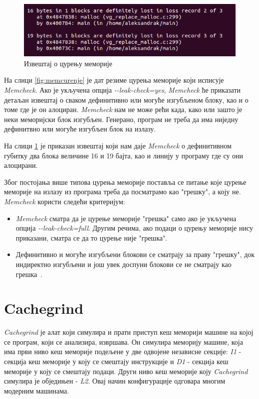 \documentclass[12pt,oneside]{memoir}
\begin{document}
\begin{figure}[h!]
\begin{center}
\includegraphics[scale=0.75]{slika9.png}
\end{center}
\caption{Извештај о цурењу меморије}
\label{fig:memizv}
\end{figure}


\indent На слици \ref{fig:memcurenje} је дат резиме цурења меморије који исписује \textit{Memcheck}. Ако је укључена опција \textit{-\--leak-check=yes}, \textit{Memcheck} ће приказати детаљан извештај о сваком дефинитивно или могуће изгубљеном блоку,  као и о томе где је он алоциран. \textit{Memcheck} нам не може рећи када, како или зашто је неки меморијски блок изгубљен. Генерано, програм не треба да има ниједну дефинитвно или могуће изгубљен блок на излазу.

\indent На слици \ref{fig:memizv} је приказан извештај који нам даје \textit{Memcheck} о дефинитивном губитку два блока величине 16 и 19 бајта, као и линију у програму где су они алоцирани.

\indent Због постојања више типова цурења меморије поставља се питање које цурење меморије на излазу из програма треба да посматрамо као "грешку", а коју не. \textit{Memcheck} користи следећи критеријум:

\begin{itemize}
  \item \textit{Memcheck} сматра да је цурење меморије "грешка" само ако је укључена опција \textit{-\--leak-check=full}. Другим речима, ако подаци о цурењу меморије нису приказани, сматра се да то цурење није "грешка".
  \item Дефинитивно и могуће изгубљени блокови се сматрају за праву "грешку", док индиректно изгубљени и још увек доспуни блокови се не сматрају као грешка~\cite{memcheckRef}.
\end{itemize}


\section{Cachegrind}
\label{section_Cachegrind}

\indent \textit{Cachegrind} је алат који симулира и прати приступ кеш меморији машине на којој се програм, који се анализира, извршава. Он симулира меморију машине, која има први ниво кеш меморије подељене у две одвојене независне секције: \textit{I1} - секција кеш меморије у коју се смештају инструкције и \textit{D1} - секција кеш меморије у коју се смештају подаци. Други ниво кеш меморије коју \textit{Cachegrind} симулира је обједињен - \textit{L2}. Овај начин конфигурације одговара многим модерним машинама.
\end{document}
